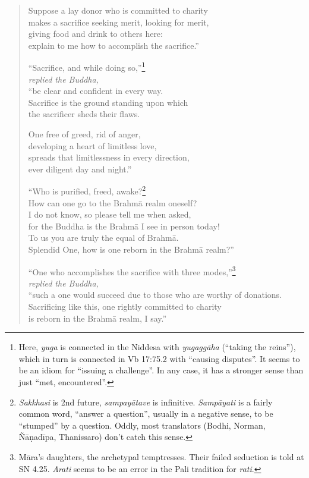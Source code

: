\documentclass[12pt,openany]{book}%
\newcommand*{\scspeaker}[1]{\hspace{2em}\textit{#1}}
\begin{document}
\begin{verse}
Suppose a lay donor who is committed to charity \\
makes a sacrifice seeking merit, looking for merit, \\
giving food and drink to others here: \\
explain to me how to accomplish the sacrifice.” 

“Sacrifice, and while doing so,”\footnote{Here, \textit{yuga} is connected in the Niddesa with \textit{\textsanskrit{yugaggāha}} (“taking the reins”), which in turn is connected in Vb 17:75.2 with “causing disputes”. It seems to be an idiom for “issuing a challenge”. In any case, it has a stronger sense than just “met, encountered”. } \\
\scspeaker{replied the Buddha, }\\
“be clear and confident in every way. \\
Sacrifice is the ground standing upon which \\
the sacrificer sheds their flaws. 

One free of greed, rid of anger, \\
developing a heart of limitless love, \\
spreads that limitlessness in every direction, \\
ever diligent day and night.” 

“Who is purified, freed, awake?\footnote{\textit{Sakkhasi} is 2nd future, \textit{\textsanskrit{sampayātave}} is infinitive. \textit{\textsanskrit{Sampāyati}} is a fairly common word, “answer a question”, usually in a negative sense, to be “stumped” by a question. Oddly, most translators (Bodhi, Norman, \textsanskrit{Ñāṇadīpa}, Thanissaro) don’t catch this sense. } \\
How can one go to the \textsanskrit{Brahmā} realm oneself? \\
I do not know, so please tell me when asked, \\
for the Buddha is the \textsanskrit{Brahmā} I see in person today! \\
To us you are truly the equal of \textsanskrit{Brahmā}. \\
Splendid One, how is one reborn in the \textsanskrit{Brahmā} realm?” 

“One who accomplishes the sacrifice with three modes,”\footnote{\textsanskrit{Māra}’s daughters, the archetypal temptresses. Their failed seduction is told at SN 4.25. \textit{Arati} seems to be an error in the Pali tradition for \textit{rati}. } \\
\scspeaker{replied the Buddha, }\\
“such a one would succeed due to those who are worthy of donations. \\
Sacrificing like this, one rightly committed to charity \\
is reborn in the \textsanskrit{Brahmā} realm, I say.” 

%
\end{verse}
\end{document}
